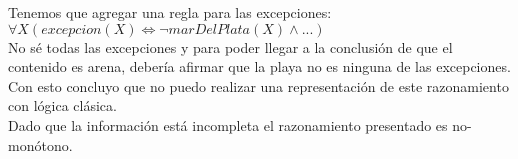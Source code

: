 Tenemos que agregar una regla para las excepciones: \\

$\forall X (excepcion(X) \iff \neg marDelPlata(X) \land ... )$ \\

No sé todas las excepciones y para poder llegar a la conclusión de que el contenido es arena, debería afirmar que la playa no es ninguna de las excepciones. Con esto concluyo que no puedo realizar una representación de este razonamiento con lógica clásica. \\

Dado que la información está incompleta el razonamiento presentado es no-monótono. 



\bigskip